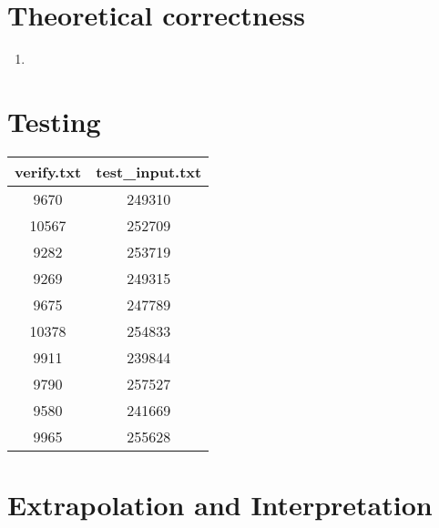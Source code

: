 \documentclass[12pt]{article}
\begin{document}
\section*{Theoretical correctness}
    \begin{enumerate}

    \item 

    \end{enumerate}

\section*{Testing}

\begin{center}
\begin{tabular}{|c|c|}
\hline
verify.txt & test\_input.txt \\ \hline
9670  & 249310 \\ \hline
10567 & 252709 \\ \hline 
9282  & 253719 \\ \hline 
9269  & 249315 \\ \hline 
9675  & 247789 \\ \hline 
10378 & 254833 \\ \hline 
9911  & 239844 \\ \hline 
9790  & 257527 \\ \hline 
9580  & 241669 \\ \hline 
9965  & 255628 \\
\hline
\end{tabular}
\end{center}

\section*{Extrapolation and Interpretation}
\end{document}
